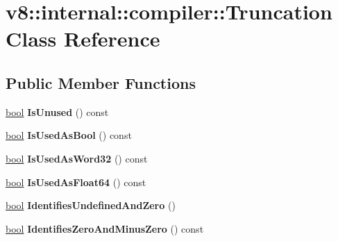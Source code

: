 \hypertarget{classv8_1_1internal_1_1compiler_1_1Truncation}{}\section{v8\+:\+:internal\+:\+:compiler\+:\+:Truncation Class Reference}
\label{classv8_1_1internal_1_1compiler_1_1Truncation}
\subsection*{Public Member Functions}
\begin{DoxyCompactItemize}
\item 
\mbox{\label{classv8_1_1internal_1_1compiler_1_1Truncation_a382862063c29cc3130af7212d69d11e9}} 
\mbox{\hyperlink{classbool}{bool}} {\bfseries Is\+Unused} () const
\item 
\mbox{\label{classv8_1_1internal_1_1compiler_1_1Truncation_aacf8c4b02596c1927ba023a580e0365f}} 
\mbox{\hyperlink{classbool}{bool}} {\bfseries Is\+Used\+As\+Bool} () const
\item 
\mbox{\label{classv8_1_1internal_1_1compiler_1_1Truncation_af8966aea5628668ba99e9b2034c272ef}} 
\mbox{\hyperlink{classbool}{bool}} {\bfseries Is\+Used\+As\+Word32} () const
\item 
\mbox{\label{classv8_1_1internal_1_1compiler_1_1Truncation_a785b11e5457c32c795a565c58145b6e8}} 
\mbox{\hyperlink{classbool}{bool}} {\bfseries Is\+Used\+As\+Float64} () const
\item 
\mbox{\label{classv8_1_1internal_1_1compiler_1_1Truncation_a5a2fd95c63bb91a75989a3af700fa60e}} 
\mbox{\hyperlink{classbool}{bool}} {\bfseries Identifies\+Undefined\+And\+Zero} ()
\item 
\mbox{\label{classv8_1_1internal_1_1compiler_1_1Truncation_ab0603ea8bea7c3a59a356dd6a02f0ec1}} 
\mbox{\hyperlink{classbool}{bool}} {\bfseries Identifies\+Zero\+And\+Minus\+Zero} () const
\item 

\end{DoxyCompactItemize}
